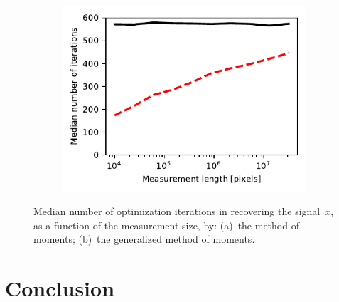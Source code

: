 \documentclass{article}
\begin{document}
\begin{figure}[!tb]
	\begin{subfigure}[ht]{\columnwidth}
		\centering
		\includegraphics[width=\columnwidth]{figures/experiment_size_iters.pdf}
	\end{subfigure}
	\caption{Median number of optimization iterations in recovering the signal~$x$, as a function of the measurement size, by: (a)~the method of moments; (b)~the generalized method of moments.}
\label{fig:iters_size_experiment}
\end{figure}

\section{Conclusion}
\label{sec:conclusion}




\vfill\pagebreak



\end{document}
